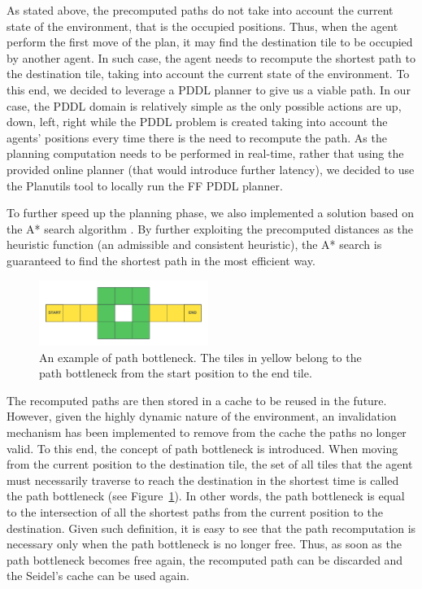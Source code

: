 As stated above, the precomputed paths do not take into account the current state of the environment, that is the occupied positions. Thus, when the agent perform the first move of the plan, it may find the destination tile to be occupied by another agent. In such case, the agent needs to recompute the shortest path to the destination tile, taking into account the current state of the environment. To this end, we decided to leverage a PDDL planner to give us a viable path. In our case, the PDDL domain is relatively simple as the only possible actions are up, down, left, right while the PDDL problem is created taking into account the agents' positions every time there is the need to recompute the path. As the planning computation needs to be performed in real-time, rather that using the provided online planner (that would introduce further latency), we decided to use the Planutils tool \parencite{planutils} to locally run the FF PDDL planner.

To further speed up the planning phase, we also implemented a  solution based on the A* search algorithm \parencite{a*}. By further exploiting the precomputed distances as the heuristic function (an admissible and consistent heuristic), the A* search is guaranteed to find the shortest path in the most efficient way.

\begin{figure}
    \centering
    \includegraphics[width=0.49\textwidth]{figures/path-bottleneck.png}
    \caption{An example of path bottleneck. The tiles in yellow belong to the path bottleneck from the start position to the end tile.}
    \label{fig:path-bottleneck}
\end{figure}

The recomputed paths are then stored in a cache to be reused in the future. However, given the highly dynamic nature of the environment, an invalidation mechanism has been implemented to remove from the cache the paths no longer valid. To this end, the concept of path bottleneck is introduced. When moving from the current position to the destination tile, the set of all tiles that the agent must necessarily traverse to reach the destination in the shortest time is called the path bottleneck (see Figure~\ref{fig:path-bottleneck}). In other words, the path bottleneck is equal to the intersection of all the shortest paths from the current position to the destination. Given such definition, it is easy to see that the path recomputation is necessary only when the path bottleneck is no longer free. Thus, as soon as the path bottleneck becomes free again, the recomputed path can be discarded and the Seidel's cache can be used again.
